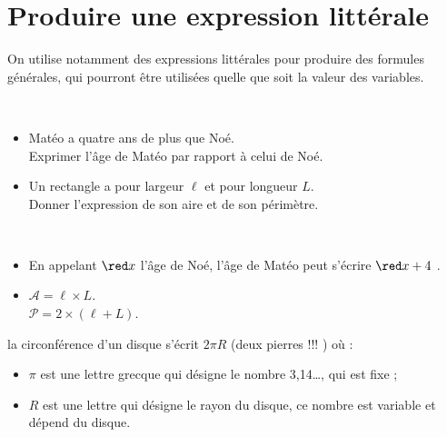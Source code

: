 \section{Produire une expression littérale}

On utilise notamment des expressions littérales pour produire des  formules générales, qui pourront être utilisées quelle que soit la valeur des variables.

\begin{exemple}[0.55]
\ \\ [-10mm]
   \begin{itemize}
      \item Matéo a quatre ans de plus que Noé. \\
         Exprimer l'âge de Matéo par rapport à celui de Noé.
      \item Un rectangle a pour largeur $\ell$ et pour longueur $L$. \\
         Donner l'expression de son aire et de son périmètre.
   \end{itemize}
   \correction
      \ \\ [-10mm]
      \begin{itemize}
         \item En appelant \og $\red x$ \fg{} l'âge de Noé, l'âge de Matéo peut s'écrire \og ${\red x}+4$ \fg.
         \item $\mathcal{A} =\ell\times L$. \\
         $\mathcal{P} =2\times(\ell+L)$.
      \end{itemize}
\end{exemple}

\medskip

\begin{remarque}
   la circonférence d'un disque s'écrit $2\pi R$ (\og deux pierres !!! \fg) où :
   \begin{itemize}
      \item $\pi$ est une lettre grecque qui désigne le nombre 3,14\dots, qui est fixe ;
      \item $R$ est une lettre qui désigne le rayon du disque, ce nombre est variable et dépend du disque.
   \end{itemize}
\end{remarque}
